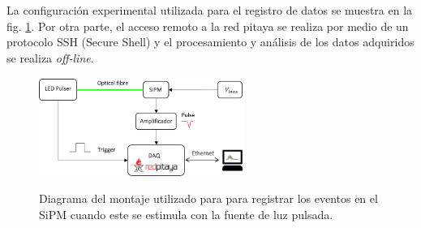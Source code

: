 La configuración experimental utilizada para el registro de datos se muestra en la fig. \ref{fig:Data_system}. Por otra parte, el acceso remoto a la red pitaya se realiza por medio de un protocolo SSH (Secure Shell) y el procesamiento y análisis de los datos adquiridos se realiza \textit{off-line}. 
\begin{figure}[h!]
\begin{centering}
    \caption{Diagrama del montaje utilizado para para registrar los eventos en el SiPM cuando este se estimula con la fuente de luz pulsada.}
    \includegraphics[width=0.6\textwidth]{Images/LED_diagrama.PNG}
    \label{fig:Data_system}
  \par\end{centering}
\end{figure}
